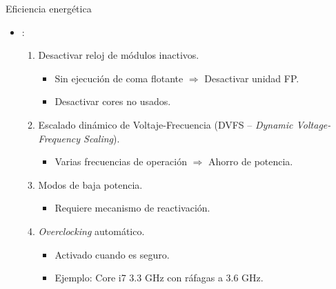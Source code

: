 \begin{frame}[t]{Eficiencia energética}
\begin{itemize}
 \item {}:
   \begin{enumerate}
     \item Desactivar reloj de módulos inactivos.
       \begin{itemize}
         \item Sin ejecución de coma flotante $\Rightarrow$ Desactivar unidad FP.
         \item Desactivar cores no usados.
       \end{itemize}

     \item Escalado dinámico de Voltaje-Frecuencia (DVFS -- \emph{Dynamic Voltage-Frequency Scaling}).
       \begin{itemize}
         \item Varias frecuencias de operación $\Rightarrow$ Ahorro de potencia.
       \end{itemize}

     \item Modos de baja potencia.
       \begin{itemize}
         \item Requiere mecanismo de reactivación.
       \end{itemize}

     \item \emph{Overclocking} automático.
       \begin{itemize}
         \item Activado cuando es seguro.
         \item Ejemplo: Core i7 3.3 GHz con ráfagas a 3.6 GHz.
       \end{itemize}
    \end{enumerate}
\end{itemize}
\end{frame}

